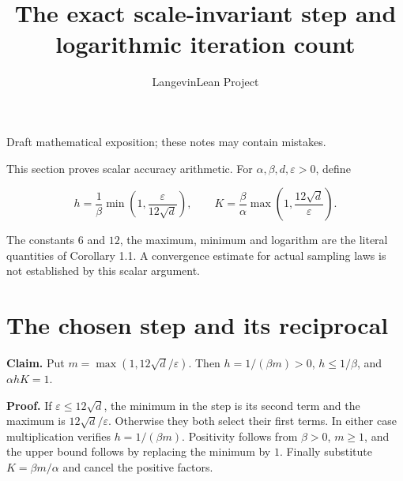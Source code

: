 \documentclass[11pt,a4paper]{article}
\title{\texorpdfstring{The exact scale-invariant step and logarithmic iteration count}{The exact scale-invariant step and logarithmic iteration count}}
\author{LangevinLean Project}
\date{}
\begin{document}
\maketitle
Draft mathematical exposition; these notes may contain mistakes.


This section proves scalar accuracy arithmetic. For \(\alpha,\beta,d,\varepsilon>0\), define

\[h=\frac1\beta\min\left(1,\frac{\varepsilon}{12\sqrt d}\right),
\qquad K=\frac\beta\alpha\max\left(1,\frac{12\sqrt d}{\varepsilon}\right).\]


The constants \(6\) and \(12\), the maximum, minimum and logarithm are the literal quantities of Corollary 1.1. A convergence estimate for actual sampling laws is not established by this scalar argument.


\section{\texorpdfstring{The chosen step and its reciprocal}{The chosen step and its reciprocal}}


\textbf{Claim.} Put \(m=\max(1,12\sqrt d/\varepsilon)\). Then \(h=1/(\beta m)>0\), \(h\le1/\beta\), and \(\alpha hK=1\).




\textbf{Proof.} If \(\varepsilon\le12\sqrt d\), the minimum in the step is its second term and the maximum is \(12\sqrt d/\varepsilon\). Otherwise they both select their first terms. In either case multiplication verifies \(h=1/(\beta m)\). Positivity follows from \(\beta>0\), \(m\ge1\), and the upper bound follows by replacing the minimum by \(1\). Finally substitute \(K=\beta m/\alpha\) and cancel the positive factors.
\end{document}
